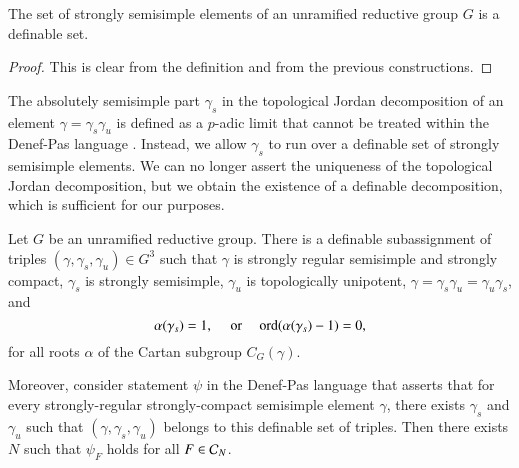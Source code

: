  \begin{lemma}  The set of strongly semisimple elements of an unramified
   reductive group $G$ is a definable set.
   \end{lemma}

 \begin{proof}  This is clear from the definition and from the previous constructions.
   \end{proof}

   \begin{remark} The absolutely semisimple part $\gamma_s$ in the
     topological Jordan decomposition of an element $\gamma = \gamma_s
     \gamma_u$ is defined as a $p$-adic limit that cannot be treated
     within the Denef-Pas language \cite{hales1993simple}.  Instead,
     we allow $\gamma_s$ to run over a definable set of strongly
     semisimple elements.  We can no longer assert the uniqueness of
     the topological Jordan decomposition, but we obtain the existence
     of a definable decomposition, which is sufficient for our
     purposes.
    \end{remark}



\begin{lemma} 
  Let $G$ be an unramified reductive group.  There is a definable
  subassignment of triples $(\gamma,\gamma_s,\gamma_u)\in G^3$ such
  that $\gamma$ is strongly regular semisimple and strongly compact,
  $\gamma_s$ is strongly semisimple,
  $\gamma_u$ is
  topologically unipotent, 
  $\gamma = \gamma_s \gamma_u = \gamma_u\gamma_s$,  and
\[
\alpha(\gamma_s)=1,
\quad\text{ or }
\quad {\operatorname{ord}}(\alpha(\gamma_s)-1)=0,
\]
for all  roots $\alpha$ of the Cartan subgroup $C_G(\gamma)$.

Moreover, consider statement $\psi$ in the Denef-Pas language that
asserts that for every strongly-regular strongly-compact semisimple
element $\gamma$, there exists $\gamma_s$ and $\gamma_u$ such that
$(\gamma,\gamma_s,\gamma_u)$ belongs to this definable set of triples.
Then there exists $N$ such that $\psi_F$ holds for all $F\in \mathcal C_N$.
\end{lemma}


